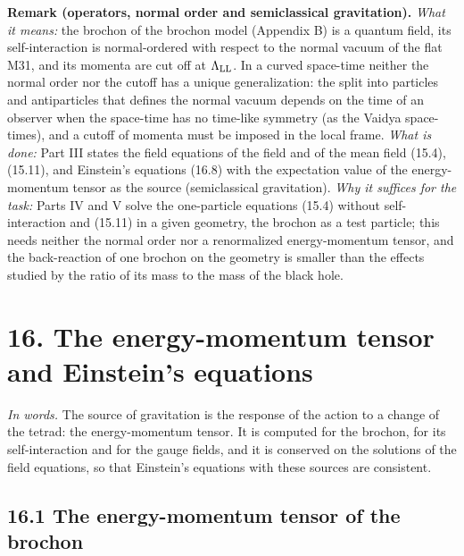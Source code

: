 \documentclass[
  10pt,
]{article}
\begin{document}
\textbf{Remark (operators, normal order and semiclassical gravitation).}
\emph{What it means:} the brochon of the brochon model (Appendix B) is a
quantum field, its self-interaction is normal-ordered with respect to
the normal vacuum of the flat M31, and its momenta are cut off at
\(\Lambda_{\rm LL}\). In a curved space-time neither the normal order
nor the cutoff has a unique generalization: the split into particles and
antiparticles that defines the normal vacuum depends on the time of an
observer when the space-time has no time-like symmetry (as the Vaidya
space-times), and a cutoff of momenta must be imposed in the local
frame. \emph{What is done:} Part III states the field equations of the
field and of the mean field (15.4), (15.11), and Einstein's equations
(16.8) with the expectation value of the energy-momentum tensor as the
source (semiclassical gravitation). \emph{Why it suffices for the task:}
Parts IV and V solve the one-particle equations (15.4) without
self-interaction and (15.11) in a given geometry, the brochon as a test
particle; this needs neither the normal order nor a renormalized
energy-momentum tensor, and the back-reaction of one brochon on the
geometry is smaller than the effects studied by the ratio of its mass to
the mass of the black hole.

\hypertarget{the-energy-momentum-tensor-and-einsteins-equations}{%
\section{16. The energy-momentum tensor and Einstein's
equations}\label{the-energy-momentum-tensor-and-einsteins-equations}}

\emph{In words.} The source of gravitation is the response of the action
to a change of the tetrad: the energy-momentum tensor. It is computed
for the brochon, for its self-interaction and for the gauge fields, and
it is conserved on the solutions of the field equations, so that
Einstein's equations with these sources are consistent.

\hypertarget{the-energy-momentum-tensor-of-the-brochon}{%
\subsection{16.1 The energy-momentum tensor of the
brochon}\label{the-energy-momentum-tensor-of-the-brochon}}
\end{document}
